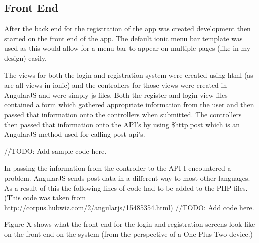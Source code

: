 \subsection{Front End}
After the back end for the registration of the app was created development then started on the front end of the app. The default ionic menu bar template was used as this would allow for a menu bar to appear on multiple pages (like in my design) easily.

The views for both the login and registration system were created using html (as are all views in ionic) and the controllers for those views were created in AngularJS and were simply js files. Both the register and login view files contained a form which gathered appropriate information from the user and then passed that information onto the controllers when submitted. The controllers then passed that information onto the API's by using \$http.post which is an AngularJS method used for calling post api's.

//TODO: Add sample code here.

In passing the information from the controller to the API I encountered a problem. AngularJS sends post data in a different way to most other languages. As a result of this the following lines of code had to be added to the PHP files. (This code was taken from \url{http://corpus.hubwiz.com/2/angularjs/15485354.html})
//TODO: Add code here.

Figure X shows what the front end for the login and registration screens look like on the front end on the system (from the perspective of a One Plus Two device.)

